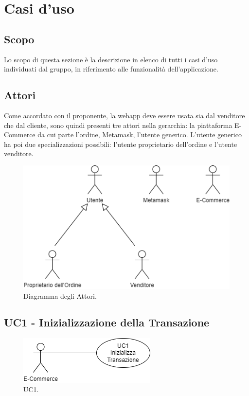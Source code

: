 \section{Casi d'uso} \label{section:casi_uso}

\subsection{Scopo}
Lo scopo di questa sezione è la descrizione in elenco di tutti i casi d'uso individuati dal gruppo, in
riferimento alle funzionalità dell'applicazione.

\subsection{Attori}
Come accordato con il proponente, la webapp deve essere usata sia dal venditore che dal cliente,
sono quindi presenti tre attori nella gerarchia: la piattaforma E-Commerce da cui parte l'ordine, Metamask\glo{}, l'utente generico.
L'utente generico ha poi due specializzazioni possibili: l'utente proprietario dell'ordine e l'utente venditore.

\begin{figure}[H]
    \centering
    \includegraphics[scale=0.7]{immagini/UseCases-Attori.png}
    \caption{Diagramma degli Attori.}
  \end{figure}

\subsection{UC1 - Inizializzazione della Transazione}

\begin{figure}[H]
    \centering
    \includegraphics[scale=0.7]{immagini/UseCases-UC1.png}
    \caption{UC1.}
  \end{figure}

